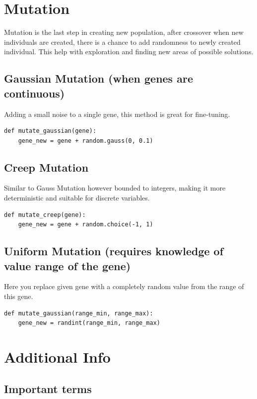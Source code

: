 \documentclass[11pt]{article}
\begin{document}
    \section{Mutation}\label{sec:mutation}
    Mutation is the last step in creating new population, after crossover when new individuals are created, there is a chance to add randomness to newly created individual.
    This help with exploration and finding new areas of possible solutions.
    
    \subsection{Gaussian Mutation (when genes are continuous)}\label{subsec:gaussian-mutation}
    Adding a small noise to a single gene, this method is great for fine-tuning.
    \begin{verbatim}
def mutate_gaussian(gene):
    gene_new = gene + random.gauss(0, 0.1)
    \end{verbatim}
    
    \subsection{Creep Mutation}\label{subsec:creep-mutation}
    Similar to Gauss Mutation however bounded to integers, making it more deterministic and suitable for discrete variables.
    \begin{verbatim}
def mutate_creep(gene):
    gene_new = gene + random.choice(-1, 1)
    \end{verbatim}

    \subsection{Uniform Mutation (requires knowledge of value range of the gene)}\label{subsec:uniform-mutation}
    Here you replace given gene with a completely random value from the range of this gene.
    \begin{verbatim}
def mutate_gaussian(range_min, range_max):
    gene_new = randint(range_min, range_max)
    \end{verbatim}

    \section{Additional Info}\label{sec:additional-info}
    
    \subsection{Important terms}\label{subsec:important-terms}
    
\end{document}
